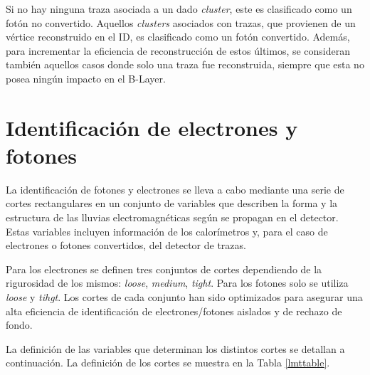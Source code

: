 Si no hay ninguna traza asociada a un dado \textit{cluster}, este es clasificado como un fotón no convertido. Aquellos \textit{clusters} asociados con trazas, que provienen de un vértice reconstruido en el ID, es clasificado como un fotón convertido. Además, para incrementar la eficiencia de reconstrucción de estos últimos, se consideran también aquellos casos donde solo una traza fue reconstruida, siempre que esta no posea ningún impacto en el B-Layer.

\section{Identificación de electrones y fotones}

La identificación de fotones y electrones se lleva a cabo mediante una serie de cortes rectangulares en un conjunto de variables que describen la forma y la estructura de las lluvias electromagnéticas según se propagan en el detector. Estas variables incluyen información de los calorímetros y, para el caso de electrones o fotones convertidos, del detector de trazas.

Para los electrones se definen tres conjuntos de cortes dependiendo de la rigurosidad de los mismos: \textit{loose}, \textit{medium}, \textit{tight}. Para los fotones solo se utiliza \textit{loose} y \textit{tihgt}. Los cortes de cada conjunto han sido optimizados para asegurar una alta eficiencia de identificación de electrones/fotones aislados y de rechazo de fondo.

La definición de las variables que determinan los distintos cortes se detallan a continuación. La definición de los cortes se muestra en la Tabla \ref{lmttable}.


